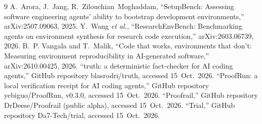 \documentclass[10pt,conference]{IEEEtran}
\begin{document}
\begin{thebibliography}{9}
 A.~Arora, J.~Jang, R.~Zilouchian~Moghaddam, ``SetupBench: Assessing software engineering agents' ability to bootstrap development environments,'' arXiv:2507.09063, 2025.
 Y.~Wang \emph{et al.}, ``ResearchEnvBench: Benchmarking agents on environment synthesis for research code execution,'' arXiv:2603.06739, 2026.
 B.~P. Vangala and T.~Malik, ``Code that works, environments that don't: Measuring environment reproducibility in AI-generated software,'' arXiv:2610.00425, 2026.
 ``truth: a deterministic fact-checker for AI coding agents,'' GitHub repository blasrodri/truth, accessed 15~Oct.~2026.
 ``ProofRun: a local verification receipt for AI coding agents,'' GitHub repository yebiguo/ProofRun, v0.3.0, accessed 15~Oct.~2026.
 ``Proofrail,'' GitHub repository DrDeese/Proofrail (public alpha), accessed 15~Oct.~2026.
 ``Trial,'' GitHub repository Da7-Tech/trial, accessed 15~Oct.~2026.
\end{thebibliography}
\end{document}
